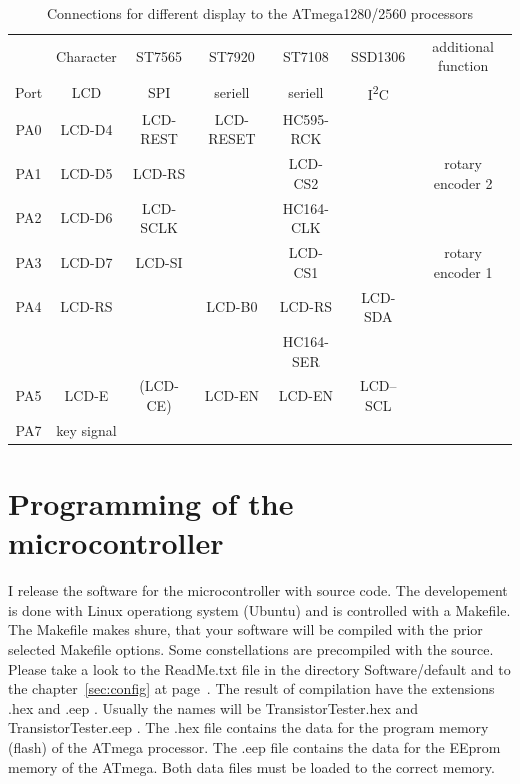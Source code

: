 \begin{table}[H]
  \begin{center}
    \begin{tabular}{| c || c | c | c | c | c | c |}
    \hline
           & Character     &  ST7565     & ST7920       & ST7108       & SSD1306     & additional function \\
      Port & LCD           &    SPI      & seriell      & seriell      &    I\textsuperscript{2}C      & \\
    \hline
    \hline
    PA0    &  LCD-D4       &   LCD-REST  &  LCD-RESET   & HC595-RCK      &             & \\
    \hline
    PA1    &  LCD-D5       &   LCD-RS    &              & LCD-CS2        &             & rotary encoder 2 \\
    \hline
    PA2    &  LCD-D6       &   LCD-SCLK  &              & HC164-CLK      &             & \\
    \hline
    PA3    &  LCD-D7       &   LCD-SI    &              & LCD-CS1        &             & rotary encoder 1 \\
    \hline
    PA4    &  LCD-RS       &             &   LCD-B0     & LCD-RS         &   LCD-SDA   & \\
           &               &             &              & HC164-SER      &             & \\
    \hline
    PA5    &  LCD-E        &   (LCD-CE)  &   LCD-EN     & LCD-EN         &   LCD--SCL  & \\
    \hline
    PA7    &  key signal   &             &              &                &             & \\
    \hline
    \end{tabular}
  \end{center}
  \caption{Connections for different display to the ATmega1280/2560 processors}
  \label{tab:display-1280}
\end{table}


\section{Programming of the microcontroller}
I release the software for the microcontroller with source code.
The developement is done with Linux operationg system (Ubuntu) and
is controlled with a Makefile. The Makefile makes shure, that your
software will be compiled with the prior selected Makefile options. Some constellations
are precompiled with the source. Please take a look to the ReadMe.txt file
in the directory Software/default and to the chapter~\ref{sec:config} at page~\pageref{sec:config}.
The result of compilation have the extensions .hex and .eep .
Usually the names will be TransistorTester.hex and TransistorTester.eep .
The .hex file contains the data for the program memory (flash) of the ATmega processor.
The .eep file contains the data for the EEprom memory of the ATmega. Both data files
must be loaded to the correct memory.

